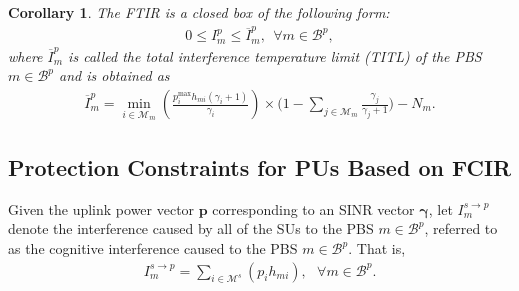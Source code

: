 \documentclass[journal,twoside]{IEEEtran}
\newcommand{\B}{\mathcal{B}}
\newcommand{\M}{\mathcal{M}}
\newcommand{\pbold}{\mathbf{p}}
\newcommand{\gammabold}{\boldsymbol{\gamma}}
\newtheorem {corollary}{Corollary}
\begin{document}
	\newcommand{\minp}{\min\limits_{i\in\M_m}\!\!\left(\frac{p_i^{\mathrm{max}} h_{mi}(\gamma_i+1)}{\gamma_i}\right)}
	\begin{corollary}
		\label{col:FTIR}
		The FTIR is a closed box of the following form:
		\begin{align}
		\label{th:FTIR}
			0\leq I^{p}_m \leq \overline{I}^p_m, \ \ \forall m\in\B^p,
		\end{align}
		where $\overline{I}^p_m$ is called the total interference temperature limit (TITL) of the PBS $m\in\B^p$ and is obtained as
		\begin{align}
		\label{eq:ITL3}
			\overline{I}^p_m \! = \! \minp 
			\! \times \!
			\bigg( 1- \!\!\! \sum_{j\in\M_m}\!\frac{\gamma_j}{\gamma_j+1} \bigg) - N_m.
		\end{align}
	\end{corollary}

\subsection{Protection Constraints for PUs Based on FCIR}

	
	Given the uplink power vector $\pbold$ corresponding to an SINR vector $\gammabold$, let $I^{s\rightarrow p}_m$ denote the interference caused by all of the SUs to the PBS $m\in\B^p$, referred to as the cognitive interference caused to the PBS $m\in\B^p$. That is, \begin{align}
	\label{eq:I_s_to_p}
		I^{s\rightarrow p}_m=\sum_{i\in\M^s}{(p_i h_{mi})},\ \ \ \forall m\in\B^p.
	\end{align}




	
\end{document}
